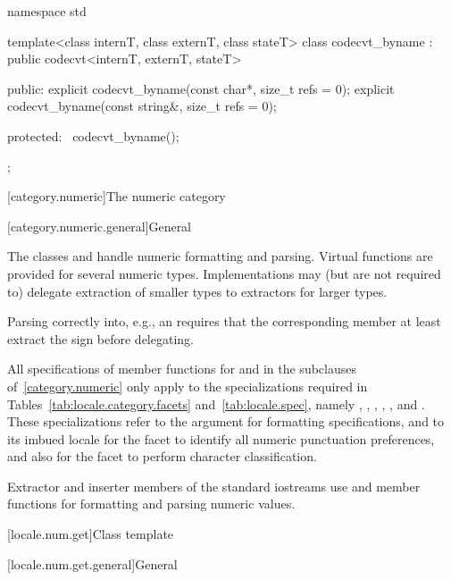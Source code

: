 %
\begin{codeblock}
namespace std {
  template<class internT, class externT, class stateT>
    class codecvt_byname : public codecvt<internT, externT, stateT> {
    public:
      explicit codecvt_byname(const char*, size_t refs = 0);
      explicit codecvt_byname(const string&, size_t refs = 0);

    protected:
      ~codecvt_byname();
    };
}
\end{codeblock}

[category.numeric]{The numeric category}

[category.numeric.general]{General}

\pnum
The classes  and 
handle numeric formatting and parsing.
Virtual functions are provided for several numeric types.
Implementations may (but are not required to) delegate
extraction of smaller types to extractors for larger types.
\begin{footnote}
Parsing  correctly into, e.g., an 
requires that the corresponding member 
at least extract the sign before delegating.
\end{footnote}

\pnum
All specifications of member functions for  and 
in the subclauses of~\ref{category.numeric} only apply to
the specializations required in Tables~\ref{tab:locale.category.facets}
and~\ref{tab:locale.spec}, namely
,
,
,
,
, and
.
These specializations refer to the  argument for
formatting specifications,
and to its imbued locale for the  facet to
identify all numeric punctuation preferences,
and also for the  facet to perform character classification.

\pnum
Extractor and inserter members of the standard iostreams use
 and  member functions for
formatting and parsing
numeric values.

[locale.num.get]{Class template }

[locale.num.get.general]{General}

